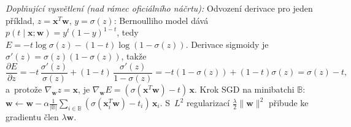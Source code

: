 \medskip
\noindent\textit{Doplňující vysvětlení (nad rámec oficiálního náčrtu):} Odvození derivace pro jeden příklad, $z=\boldsymbol{x}^T\boldsymbol{w}$, $y=\sigma(z)$: Bernoulliho model dává $p(t\mid\boldsymbol{x};\boldsymbol{w})=y^t(1-y)^{1-t}$, tedy $E=-t\log\sigma(z)-(1-t)\log(1-\sigma(z))$. Derivace sigmoidy je $\sigma'(z)=\sigma(z)(1-\sigma(z))$, takže
\[ \frac{\partial E}{\partial z}=-t\,\frac{\sigma'(z)}{\sigma(z)}+(1-t)\,\frac{\sigma'(z)}{1-\sigma(z)}=-t(1-\sigma(z))+(1-t)\sigma(z)=\sigma(z)-t, \]
a~protože $\nabla_{\boldsymbol{w}}z=\boldsymbol{x}$, je $\nabla_{\boldsymbol{w}}E=(\sigma(\boldsymbol{x}^T\boldsymbol{w})-t)\,\boldsymbol{x}$. Krok SGD na minibatchi $\mathbb{B}$: $\boldsymbol{w}\leftarrow\boldsymbol{w}-\alpha\frac{1}{|\mathbb{B}|}\sum_{i\in\mathbb{B}}(\sigma(\boldsymbol{x}_i^T\boldsymbol{w})-t_i)\,\boldsymbol{x}_i$. S~$L^2$ regularizací $\frac{\lambda}{2}\|\boldsymbol{w}\|^2$ přibude ke gradientu člen $\lambda\boldsymbol{w}$.
